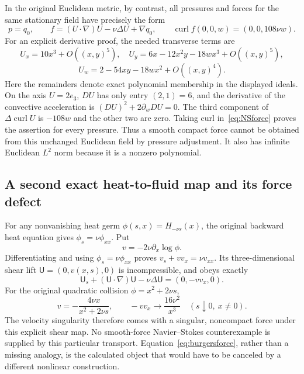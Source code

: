 \documentclass[11pt,a4paper]{article}
\theoremstyle{definition}\newtheorem{definition}[theorem]{Definition}\newtheorem{remark}[theorem]{Remark}
\newcommand{\curl}{\operatorname{curl}}
\begin{document}
In the original Euclidean metric, by contrast, all pressures and forces for the same stationary field have precisely the form
\begin{equation}
 p=q_0,\qquad f=(U\cdot\nabla)U-\nu\Delta U+\nabla q_0,
 \qquad\curl f(0,0,w)=(0,0,108\nu w).                   \label{eq:NSforce}
\end{equation}
For an explicit derivative proof, the needed transverse terms are
\[
 U_x=10x^3+O((x,y)^5),\quad
 U_y=6x-12x^2y-18wx^3+O((x,y)^5),
\]
\[
 U_w=2-54xy-18wx^2+O((x,y)^4).
\]
Here the remainders denote exact polynomial membership in the displayed ideals. On the axis $U=2e_3$, $DU$ has only entry $(2,1)=6$, and the derivative of the convective acceleration is $(DU)^2+2\partial_w DU=0$. The third component of $\Delta\curl U$ is $-108w$ and the other two are zero. Taking curl in~\eqref{eq:NSforce} proves the assertion for every pressure. Thus a smooth compact force cannot be obtained from this unchanged Euclidean field by pressure adjustment. It also has infinite Euclidean $L^2$ norm because it is a nonzero polynomial.

\subsection{A second exact heat-to-fluid map and its force defect}
For any nonvanishing heat germ $\phi(s,x)=H_{-\nu s}(x)$, the original backward heat equation gives $\phi_s=\nu\phi_{xx}$. Put
\begin{equation}
 v=-2\nu\partial_x\log\phi.
\end{equation}
Differentiating and using $\phi_s=\nu\phi_{xx}$ proves $v_s+vv_x=\nu v_{xx}$. Its three-dimensional shear lift $\mathsf U=(0,v(x,s),0)$ is incompressible, and obeys exactly
\begin{equation}
 \mathsf U_s+(\mathsf U\cdot\nabla)\mathsf U-\nu\Delta\mathsf U
 =(0,-vv_x,0).                                         \label{eq:burgersforce}
\end{equation}
For the original quadratic collision $\phi=x^2+2\nu s$,
\[
 v=-\frac{4\nu x}{x^2+2\nu s},\qquad
 -vv_x\longrightarrow\frac{16\nu^2}{x^3}\quad(s\downarrow0,\ x\ne0).
\]
The velocity singularity therefore comes with a singular, noncompact force under this explicit shear map. No smooth-force Navier--Stokes counterexample is supplied by this particular transport. Equation~\eqref{eq:burgersforce}, rather than a missing analogy, is the calculated object that would have to be canceled by a different nonlinear construction.
\end{document}
